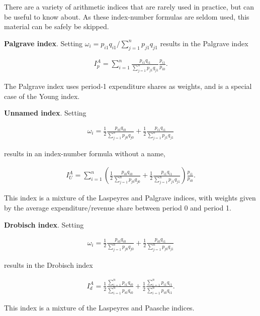 \documentclass[]{article}
\begin{document}
There are a variety of arithmetic indices that are rarely used in practice, but can be useful to know about. As these index-number formulas are seldom used, this material can be safely be skipped.

\textbf{Palgrave index}. Setting \(\omega_{i} = p_{i1} q_{i1} / \sum_{j = 1}^{n} p_{j1} q_{j1}\) results in the Palgrave index

\begin{align*}
I^{A}_{p} = \sum_{i = 1}^{n} \frac{p_{i1} q_{i1}}{\sum_{j = 1}^{n} p_{j1} q_{j1}} \frac{p_{i1}}{p_{i0}}.
\end{align*}

The Palgrave index uses period-1 expenditure shares as weights, and is a special case of the Young index.

\textbf{Unnamed index}. Setting

\begin{align*}
\omega_{i} = \frac{1}{2} \frac{p_{i0} q_{i0}}{\sum_{j = 1}^{n} p_{j0} q_{j0}} + \frac{1}{2} \frac{p_{i1} q_{i1}}{\sum_{j = 1}^{n} p_{j1} q_{j1}}
\end{align*}

results in an index-number formula without a name,

\begin{align*}
I^{A}_{U} = \sum_{i = 1}^{n} \left(\frac{1}{2} \frac{p_{i0} q_{i0}}{\sum_{j = 1}^{n} p_{j0} q_{j0}} + \frac{1}{2} \frac{p_{i1} q_{i1}}{\sum_{j = 1}^{n} p_{j1} q_{j1}}\right) \frac{p_{i1}}{p_{i0}}.
\end{align*}

This index is a mixture of the Laspeyres and Palgrave indices, with weights given by the average expenditure/revenue share between period 0 and period 1.

\textbf{Drobisch index}. Setting

\begin{align*}
\omega_{i} = \frac{1}{2} \frac{p_{i0} q_{i0}}{\sum_{j = 1}^{n} p_{j0} q_{j0}} + \frac{1}{2} \frac{p_{i0} q_{i1}}{\sum_{j = 1}^{n} p_{j0} q_{j1}}
\end{align*}

results in the Drobisch index

\begin{align*}
I^{A}_{d} = \frac{1}{2} \frac{\sum_{i = 1}^{n} p_{i1} q_{i0}}{\sum_{i = 1}^{n} p_{i0} q_{i0}} + \frac{1}{2} \frac{\sum_{i = 1}^{n} p_{i1} q_{i1}}{\sum_{i = 1}^{n} p_{i0} q_{i1}}.
\end{align*}

This index is a mixture of the Laspeyres and Paasche indices.
\end{document}
